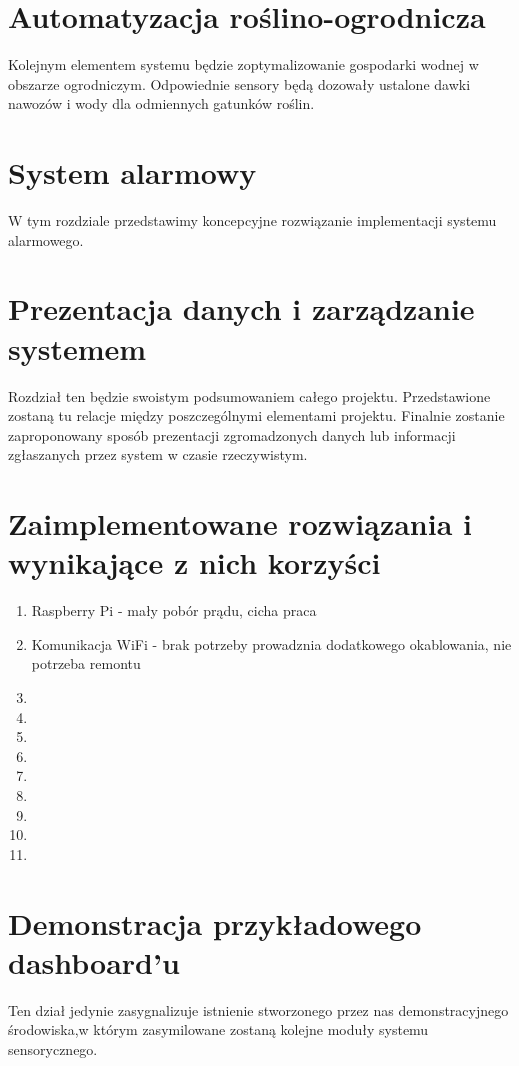 \documentclass[12pt]{article} %
\begin{document}
\section{Automatyzacja roślino-ogrodnicza}
Kolejnym elementem systemu będzie zoptymalizowanie gospodarki wodnej w obszarze ogrodniczym. Odpowiednie sensory będą dozowały ustalone dawki nawozów i wody dla odmiennych gatunków roślin.

\section{System alarmowy}
W tym rozdziale przedstawimy koncepcyjne rozwiązanie implementacji systemu alarmowego.

\section{Prezentacja danych i zarządzanie systemem}
Rozdział ten będzie swoistym podsumowaniem całego projektu. Przedstawione zostaną tu relacje między poszczególnymi elementami projektu. Finalnie zostanie zaproponowany sposób prezentacji zgromadzonych danych lub informacji zgłaszanych przez system w czasie rzeczywistym.

\section{Zaimplementowane rozwiązania i wynikające z nich korzyści}
\begin{enumerate}
\item Raspberry Pi - mały pobór prądu, cicha praca
\item Komunikacja WiFi - brak potrzeby prowadznia dodatkowego okablowania, nie potrzeba remontu
\item 
\item 
\item 
\item 
\item 
\item 
\item 
\item 
\item 
\end{enumerate}

\section{Demonstracja przykładowego dashboard'u}
Ten dział jedynie zasygnalizuje istnienie stworzonego przez nas demonstracyjnego środowiska,w którym zasymilowane zostaną kolejne moduły systemu sensorycznego.
\end{document}
